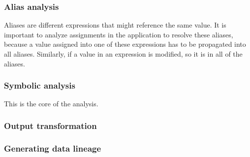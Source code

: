 \subsubsection{Alias analysis}

Aliases are different expressions that might reference the same value. It is important to analyze assignments in the application to resolve these aliases, because a value assigned into one of these expressions has to be propagated into all aliases. Similarly, if a value in an expression is modified, so it is in all of the aliases.

\subsubsection{Symbolic analysis}

This is the core of the analysis. 

\subsubsection{Output transformation}

\subsubsection{Generating data lineage}

